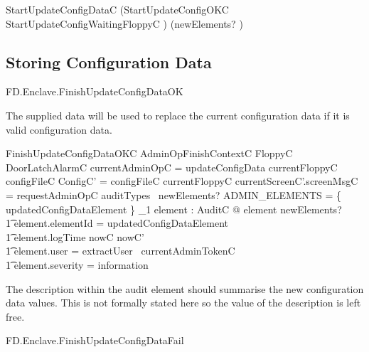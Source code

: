 \begin{zed}
        StartUpdateConfigDataC  (StartUpdateConfigOKC  
         \lor StartUpdateConfigWaitingFloppyC ) \hide
(newElements? )
\end{zed}

\subsection{Storing Configuration Data}

\begin{traceunit}{FD.Enclave.FinishUpdateConfigDataOK}
\end{traceunit}



The supplied data will be used to replace the current configuration data
if it is valid configuration data.

\begin{schema}{FinishUpdateConfigDataOKC}
        AdminOpFinishContextC
\also
        \Xi FloppyC
\\      \Xi DoorLatchAlarmC
\where
        \The currentAdminOpC = updateConfigData
\also        
        currentFloppyC \in \ran configFileC
\also
        \theta ConfigC' = configFileC \inv currentFloppyC
\also
        currentScreenC'.screenMsgC = requestAdminOpC
\also
        auditTypes~ newElements? \cap ADMIN\_ELEMENTS = 
        \{ updatedConfigDataElement \} 
\also
        \exists_1 element : AuditC @ element \in newElements? 
\\ \t1  \land element.elementId = updatedConfigDataElement
\\ \t1  \land element.logTime \in nowC \upto nowC'
\\ \t1  \land element.user = extractUser~ currentAdminTokenC
\\ \t1  \land element.severity = information
\end{schema}
\begin{Zcomment}
\item
The description within the audit element should summarise the new
configuration data values. This is not formally stated here so the
value of the description is left free.
\end{Zcomment}

\begin{traceunit}{FD.Enclave.FinishUpdateConfigDataFail}
\end{traceunit}


